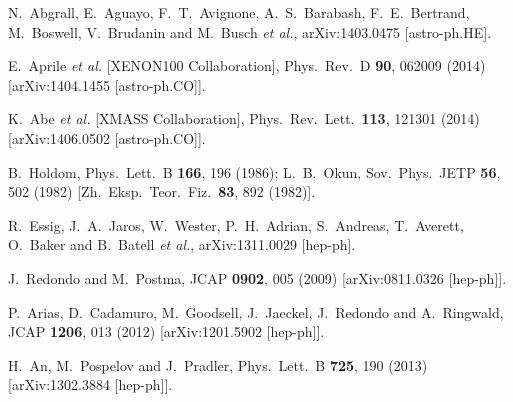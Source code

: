 \documentclass[prd,reprint,nofootinbib,notitlepage,aps,tightenlines,preprintnumbers,amsmath,amssymb,showpacs,superscriptaddress]{revtex4-1}
\begin{document}
\begin{thebibliography}{99}
  N.~Abgrall, E.~Aguayo, F.~T.~Avignone, A.~S.~Barabash, F.~E.~Bertrand, M.~Boswell, V.~Brudanin and M.~Busch {\it et al.},
  arXiv:1403.0475 [astro-ph.HE].

  E.~Aprile {\it et al.}  [XENON100 Collaboration],
  Phys.\ Rev.\ D {\bf 90}, 062009 (2014)
  [arXiv:1404.1455 [astro-ph.CO]].

  K.~Abe {\it et al.}  [XMASS Collaboration],
  Phys.\ Rev.\ Lett.\  {\bf 113}, 121301 (2014)
  [arXiv:1406.0502 [astro-ph.CO]].

  B.~Holdom,
  Phys.\ Lett.\ B {\bf 166}, 196 (1986); 
L.~B.~Okun,
  Sov.\ Phys.\ JETP {\bf 56}, 502 (1982)
  [Zh.\ Eksp.\ Teor.\ Fiz.\  {\bf 83}, 892 (1982)].

  R.~Essig, J.~A.~Jaros, W.~Wester, P.~H.~Adrian, S.~Andreas, T.~Averett, O.~Baker and B.~Batell {\it et al.},
  arXiv:1311.0029 [hep-ph].


 J.~Redondo and M.~Postma,
  JCAP {\bf 0902}, 005 (2009)
  [arXiv:0811.0326 [hep-ph]].


  P.~Arias, D.~Cadamuro, M.~Goodsell, J.~Jaeckel, J.~Redondo and A.~Ringwald,
  JCAP {\bf 1206}, 013 (2012)
  [arXiv:1201.5902 [hep-ph]].


  H.~An, M.~Pospelov and J.~Pradler,
  Phys.\ Lett.\ B {\bf 725}, 190 (2013)
  [arXiv:1302.3884 [hep-ph]].


\end{thebibliography}
\end{document}

